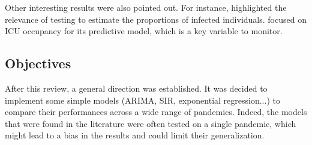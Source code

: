 Other interesting results were also pointed out. 
For instance, \cite{hult2020estimates} highlighted the relevance of testing to estimate the proportions of infected individuals. 
\cite{sjodin2020covid} focused on ICU occupancy for its predictive model, which is a key variable to monitor. 

\subsection{Objectives}

After this review, a general direction was established. 
It was decided to implement some simple models (ARIMA, SIR, exponential regression...) to compare their performances across a wide range of pandemics. 
Indeed, the models that were found in the literature were often tested on a single pandemic, which might lead to a bias in the results and could limit their generalization. 
